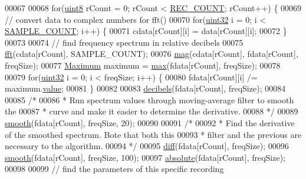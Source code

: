 \begin{DoxyCode}
00067 
00068         \textcolor{keywordflow}{for}(\hyperlink{definitions_8hpp_adde6aaee8457bee49c2a92621fe22b79}{uint8} rCount = 0; rCount < \hyperlink{definitions_8hpp_aa44e6143be9e89f19be973956c22e134}{REC\_COUNT}; rCount++) \{
00069             \textcolor{comment}{// convert data to complex numbers for fft()}
00070             \textcolor{keywordflow}{for}(\hyperlink{definitions_8hpp_a1134b580f8da4de94ca6b1de4d37975e}{uint32} i = 0; i < \hyperlink{definitions_8hpp_a1682c770d91c5d167b621a782be940d4}{SAMPLE\_COUNT}; i++) \{
00071                 cdata[rCount][i] = data[rCount][i];
00072             \}
00073 
00074             \textcolor{comment}{// find frequency spectrum in relative decibels}
00075             \hyperlink{namespacevaso_af74f08a8afd7967b6c2b3c2b0e5fb1e9}{fft}(cdata[rCount], SAMPLE\_COUNT);
00076             \hyperlink{namespacevaso_a5d355b5c326a852e2ce95c258450898c}{mag}(cdata[rCount], fdata[rCount], freqSize);
00077             \hyperlink{structMaximum}{Maximum} maximum = \hyperlink{namespacevaso_a122846d728be312454a452d379915e10}{max}(fdata[rCount], freqSize);
00078 
00079             \textcolor{keywordflow}{for}(\hyperlink{definitions_8hpp_a1134b580f8da4de94ca6b1de4d37975e}{uint32} i = 0; i < freqSize; i++) \{
00080                 fdata[rCount][i] /= maximum.\hyperlink{structMaximum_aa7e84cbf37b694670142670014366969}{value};
00081             \}
00082 
00083             \hyperlink{namespacevaso_af9bb2211cf3478333dfc1873bf316263}{decibels}(fdata[rCount], freqSize);
00084 
00085             \textcolor{comment}{/*}
00086 \textcolor{comment}{             * Run spectrum values through moving-average filter to smooth the}
00087 \textcolor{comment}{             * curve and make it easier to determine the derivative.}
00088 \textcolor{comment}{             */}
00089             \hyperlink{namespacevaso_a5b7fc1a58199e2cac989f417a9faa1ce}{smooth}(fdata[rCount], freqSize, 20);
00090 
00091             \textcolor{comment}{/*}
00092 \textcolor{comment}{             * Find the derivative of the smoothed spectrum. Bote that both this}
00093 \textcolor{comment}{             * filter and the previous are necessary to the algorithm.}
00094 \textcolor{comment}{             */}
00095             \hyperlink{namespacevaso_a7d108bce812e906d8b1810815774c7ea}{diff}(fdata[rCount], freqSize);
00096             \hyperlink{namespacevaso_a5b7fc1a58199e2cac989f417a9faa1ce}{smooth}(fdata[rCount], freqSize, 100);
00097             \hyperlink{namespacevaso_a6ca90add966ce1773fc59a6883e6cd0c}{absolute}(fdata[rCount], freqSize);
00098 
00099             \textcolor{comment}{// find the parameters of this specific recording}

\end{DoxyCode}
